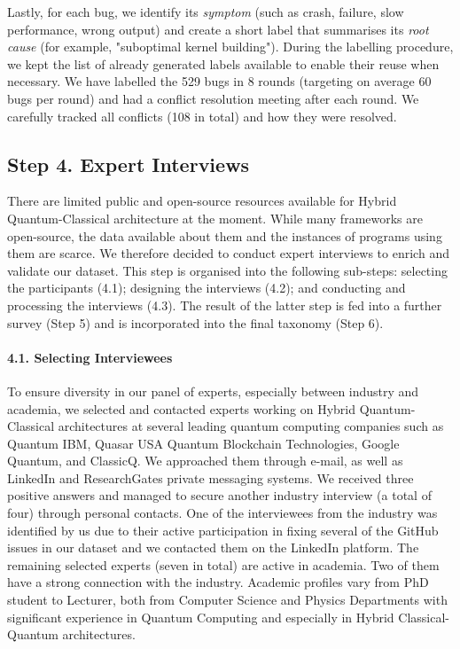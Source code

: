 Lastly, for each bug, we identify its \textit{symptom} (such as crash, failure, slow performance, wrong output) and create a short label that summarises its \textit{root cause} (for example, "suboptimal kernel building"). During the labelling procedure, we kept the list of already generated labels available to enable their reuse when necessary. We have labelled the 529 bugs in 8 rounds (targeting on average 60 bugs per round) and had a conflict resolution meeting after each round. We carefully tracked all conflicts (108 in total) and how they were resolved.


\subsection*{Step 4. Expert Interviews}
There are limited public and open-source resources available for Hybrid Quantum-Classical architecture at the moment. While many frameworks are open-source, the data available about them and the instances of programs using them are scarce. We therefore decided to conduct expert interviews to enrich and validate our dataset. This step is organised into the following sub-steps: selecting the participants (4.1); designing the interviews (4.2); and conducting and processing the interviews (4.3). The result of the latter step is fed into a further survey (Step 5) and is incorporated into the final taxonomy (Step 6). 

\paragraph*{4.1. Selecting 
Interviewees} 
To ensure diversity in our panel of experts, especially between industry and academia, we selected and contacted experts working on Hybrid Quantum-Classical architectures at several leading quantum computing companies such as Quantum IBM, Quasar USA Quantum Blockchain Technologies, Google Quantum, and ClassicQ. We approached them through e-mail, as well as LinkedIn and ResearchGates private messaging systems. We received three positive answers and managed to secure another industry interview (a total of four) through personal contacts. One of the interviewees from the industry was identified by us due to their active participation in fixing several of the GitHub issues in our dataset and we contacted them on the LinkedIn platform. The remaining selected experts  (seven in total) are active in academia. Two of them have a strong connection with the industry. Academic profiles vary from PhD student to Lecturer, both from Computer Science and Physics Departments with significant experience in Quantum Computing and especially in Hybrid Classical-Quantum architectures. 

